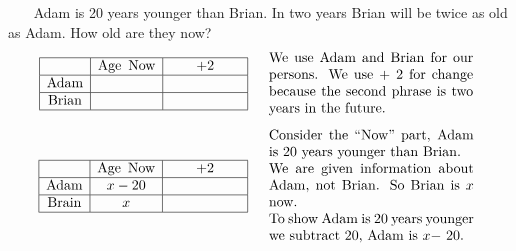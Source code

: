 \begin{example}\label{Lin82}~~~ Adam is 20 years younger than Brian. In two years Brian will be twice as
  old as Adam. How old are they now?
  \begin{eqnarray*}
    \begin{array}{|c|c|c|}
      \hline
      & \tmop{Age~} \tmop{Now} & + 2\\
      \hline
      \tmop{Adam} &  & \mbox{\hspace{.7in}}\\
      \hline
      \tmop{Brian} &  & \\
      \hline
    \end{array} &  & \begin{array}{p{0.425\textwidth}}
      \tmop{We} \tmop{use} \tmop{Adam} \tmop{and} \tmop{Brian} \tmop{for}
      \tmop{our} \tmop{persons}.  
      \tmop{We} \tmop{use} + 2 \tmop{for} \tmop{change} \tmop{because}
      \tmop{the} \tmop{second} \tmop{phrase}
      \tmop{is} \tmop{two} \tmop{years} \tmop{in} \tmop{the} \tmop{future}.
    \end{array}\\
  \end{eqnarray*}
  \begin{eqnarray*}
    \begin{array}{|c|c|c|}
      \hline
      & \tmop{Age~} \tmop{Now} & + 2\\
      \hline
      \tmop{Adam} & x - 20 & \mbox{\hspace{.70in}}\\
      \hline
      \tmop{Brain} & x & \\
      \hline
    \end{array} &  & \begin{array}{p{0.425\textwidth}}
      \tmop{Consider} \tmop{the} ``\tmop{Now}'' \tmop{part},
      \tmop{Adam} \tmop{is} 20 \tmop{years}
      \tmop{younger} \tmop{than} \tmop{Brian}.\\
			\tmop{We} \tmop{are}
      \tmop{given} \tmop{information} \tmop{about} \tmop{Adam}, \tmop{not} \tmop{Brian}. \tmop{So} \tmop{Brian} \tmop{is}
      $x$ \tmop{now}.\\
			\tmop{To} \tmop{show} \tmop{Adam}
      \tmop{is} 20 \tmop{years} \tmop{younger} \tmop{we} \tmop{subtract} 20,
      \tmop{Adam} \tmop{is} $x -$ 20.
    \end{array}\\
    &  & \\
    \begin{array}{|c|c|c|}
      \hline

\end{array}
\end{eqnarray*}
\end{example}

